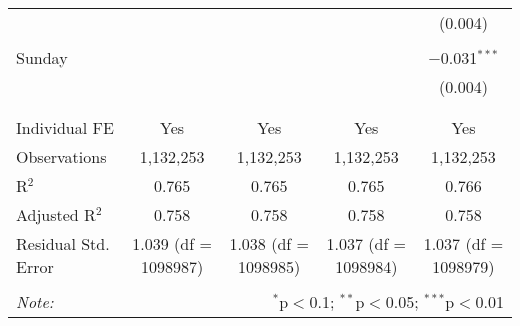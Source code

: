 \documentclass[
]{article}
\begin{document}
\begin{table}[!htbp]
{\begin{tabular}{@{\extracolsep{5pt}}lcccc}
  &  &  &  & (0.004) \\ 
  & & & & \\ 
 Sunday &  &  &  & $-$0.031$^{***}$ \\ 
  &  &  &  & (0.004) \\ 
  & & & & \\ 
\hline \\[-1.8ex] 
Individual FE & Yes & Yes & Yes & Yes \\ 
Observations & 1,132,253 & 1,132,253 & 1,132,253 & 1,132,253 \\ 
R$^{2}$ & 0.765 & 0.765 & 0.765 & 0.766 \\ 
Adjusted R$^{2}$ & 0.758 & 0.758 & 0.758 & 0.758 \\ 
Residual Std. Error & 1.039 (df = 1098987) & 1.038 (df = 1098985) & 1.037 (df = 1098984) & 1.037 (df = 1098979) \\ 
\hline 
\hline \\[-1.8ex] 
\textit{Note:}  & \multicolumn{4}{r}{$^{*}$p$<$0.1; $^{**}$p$<$0.05; $^{***}$p$<$0.01} \\ 
\end{tabular}
} 
\end{table} 
\newpage
\end{document}
